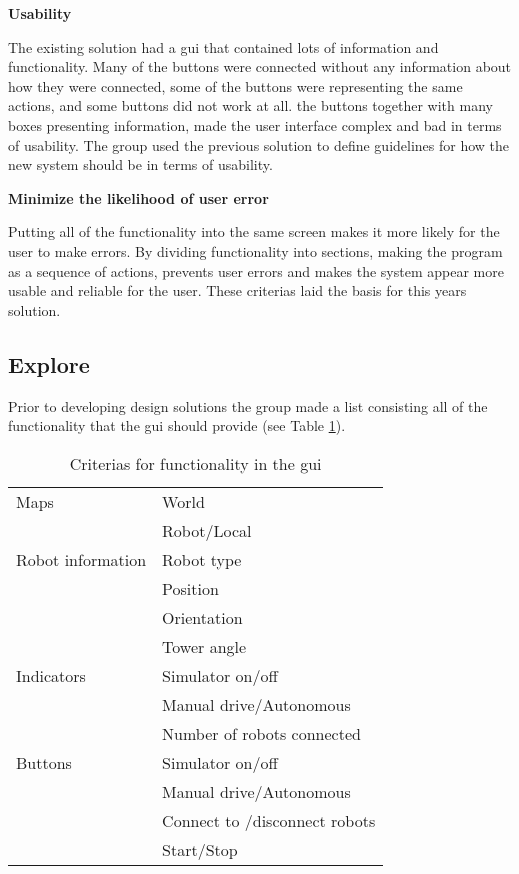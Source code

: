 \textbf{Usability}

The existing solution had a \acrshort{gui} that contained lots of information and functionality. Many of the buttons were connected without any information about how they were connected, some of the buttons were representing the same actions, and some buttons did not work at all. the buttons together with many boxes presenting information, made the user interface complex and bad in terms of usability. The group used the previous solution to define guidelines for how the new system should be in terms of usability.

\textbf{Minimize the likelihood of user error}

Putting all of the functionality into the same screen makes it more likely for the user to make errors. By dividing functionality into sections, making the program as a sequence of actions, prevents user errors and makes the system appear more usable and reliable for the user. These criterias laid the basis for this years solution. 

\subsection{Explore}
Prior to developing design solutions the group made a list consisting all of the functionality that the \acrshort{gui} should provide (see Table \ref{tab:guicriterias}).
\begin{table}[ht]
\begin{center}
 \begin{tabular}{|l l|} 
 \hline
 Maps               &   World \\
                    &   Robot/Local \\
 \hline
 Robot information  &   Robot type \\
                    &   Position \\
                    &   Orientation \\
                    &   Tower angle \\
 \hline
 Indicators         &   Simulator on/off \\
                    &   Manual drive/Autonomous \\
                    &   Number of robots connected \\
 \hline
 Buttons            &   Simulator on/off \\
                    &   Manual drive/Autonomous \\
                    &   Connect to /disconnect robots \\
                    &   Start/Stop \\

\hline
\end{tabular}
\end{center}
\caption{Criterias for functionality in the \acrshort{gui}}
\label{tab:guicriterias}
\end{table}

